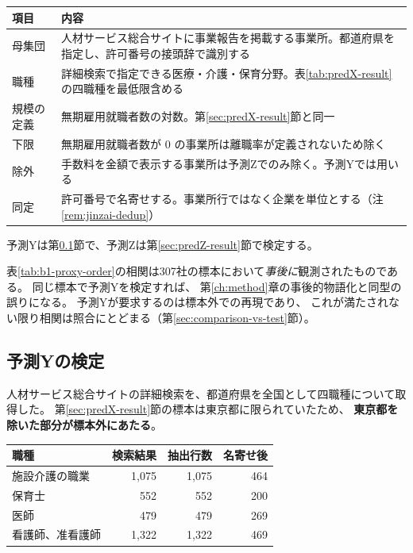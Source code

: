 \begin{center}
\begin{tabularx}{\textwidth}{@{}lX@{}}
\toprule
項目 & 内容 \\
\midrule
母集団 & 人材サービス総合サイトに事業報告を掲載する事業所。都道府県を指定し、許可番号の接頭辞で識別する \\
職種 & 詳細検索で指定できる医療・介護・保育分野。表\ref{tab:predX-result}の四職種を最低限含める \\
規模の定義 & 無期雇用就職者数の対数。第\ref{sec:predX-result}節と同一 \\
下限 & 無期雇用就職者数が 0 の事業所は離職率が定義されないため除く \\
除外 & 手数料を金額で表示する事業所は予測Zでのみ除く。予測Yでは用いる \\
同定 & 許可番号で名寄せする。事業所行ではなく企業を単位とする（注\ref{rem:jinzai-dedup}） \\
\bottomrule
\end{tabularx}
\label{tab:predYZ-registration}
\end{center}

予測Yは第\ref{sec:predY-result}節で、予測Zは第\ref{sec:predZ-result}節で検定する。

\begin{remark}[同一標本で検定してはならない]
\label{rem:no-same-sample-test}
表\ref{tab:b1-proxy-order}の相関は307社の標本において\emph{事後に}観測されたものである。
同じ標本で予測Yを検定すれば、
第\ref{ch:method}章の事後的物語化と同型の誤りになる。
予測Yが要求するのは標本外での再現であり、
これが満たされない限り相関は照合にとどまる（第\ref{sec:comparison-vs-test}節）。
\end{remark}

\subsection{予測Yの検定}
\label{sec:predY-result}

人材サービス総合サイトの詳細検索を、都道府県を全国として四職種について取得した。
第\ref{sec:predX-result}節の標本は東京都に限られていたため、
\textbf{東京都を除いた部分が標本外にあたる}。

\begin{center}
\begin{tabular}{@{}lrrr@{}}
\toprule
職種 & 検索結果 & 抽出行数 & 名寄せ後 \\
\midrule
施設介護の職業 & 1,075 & 1,075 & 464 \\
保育士 & 552 & 552 & 200 \\
医師 & 479 & 479 & 269 \\
看護師、准看護師 & 1,322 & 1,322 & 469 \\
\bottomrule
\end{tabular}
\label{tab:predY-sample}
\end{center}

